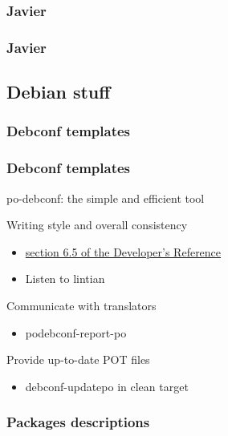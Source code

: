 \documentclass{beamer}
\begin{document}
\begin{frame}
  \frametitle{Javier}
\end{frame}

\begin{frame}
  \frametitle{Javier}
\end{frame}

\subsection{Debian stuff}

\subsubsection{Debconf templates}

\begin{frame}
  \frametitle{Debconf templates}
	\begin{block}
		{po-debconf: the simple and efficient tool}
	\end{block}
	\begin{block}
		{Writing style and overall consistency}
		\begin{itemize}
		\item
			\href{http://www.debian.org/doc/developers-reference/ch-best-pkging-practices.html\#s-bpp-config-mgmt}{section 6.5 of the Developer's Reference}
		\item
			Listen to lintian
		\end{itemize}
	\end{block}
	\begin{block}
		{Communicate with translators}
		\begin{itemize}
		\item
			podebconf-report-po
		\end{itemize}
	\end{block}
	\begin{block}
		{Provide up-to-date POT files}
		\begin{itemize}
		\item
			debconf-updatepo in clean target
		\end{itemize}
	\end{block}
\end{frame}

\subsubsection{Packages descriptions}
\end{document}
